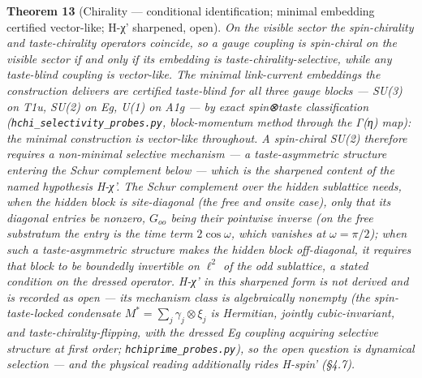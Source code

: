 \documentclass[
]{article}
\begin{document}
\textbf{Theorem 13} (Chirality --- conditional identification; minimal
embedding certified vector-like; H-χ' sharpened, open). \emph{On the
visible sector the spin-chirality and taste-chirality operators
coincide, so a gauge coupling is spin-chiral on the visible sector if
and only if its embedding is taste-chirality-selective, while any
taste-blind coupling is vector-like. The minimal link-current embeddings
the construction delivers are certified taste-blind for all three gauge
blocks --- SU(3) on T1u, SU(2) on Eg, U(1) on A1g --- by exact
spin⊗taste classification (\texttt{hchi\_selectivity\_probes.py},
block-momentum method through the Γ(η) map): the minimal construction is
vector-like throughout. A spin-chiral SU(2) therefore requires a
non-minimal selective mechanism --- a taste-asymmetric structure
entering the Schur complement below --- which is the sharpened content
of the named hypothesis H-χ'. The Schur complement over the hidden
sublattice needs, when the hidden block is site-diagonal (the free and
onsite case), only that its diagonal entries be nonzero, \(G_{oo}\)
being their pointwise inverse (on the free substratum the entry is the
time term \(2\cos\omega\), which vanishes at \(\omega = \pi/2\)); when
such a taste-asymmetric structure makes the hidden block off-diagonal,
it requires that block to be boundedly invertible on \(\ell^2\) of the
odd sublattice, a stated condition on the dressed operator. H-χ' in this
sharpened form is not derived and is recorded as open --- its mechanism
class is algebraically nonempty (the spin-taste-locked condensate
\(M^* = \sum_j \gamma_j \otimes \xi_j\) is Hermitian, jointly
cubic-invariant, and taste-chirality-flipping, with the dressed Eg
coupling acquiring selective structure at first order;
\texttt{hchiprime\_probes.py}), so the open question is dynamical
selection --- and the physical reading additionally rides H-spin'
(§4.7).}
\end{document}
